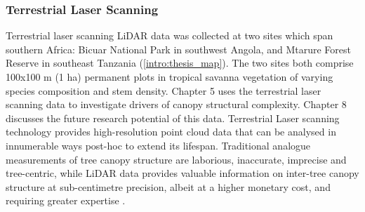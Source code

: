 \begin{refsection}
\subsubsection{Terrestrial Laser Scanning}
\label{intro:sssec:tls}

Terrestrial laser scanning LiDAR data was collected at two sites which span southern Africa: Bicuar National Park in southwest Angola, and Mtarure Forest Reserve in southeast Tanzania (\autoref{intro:thesis_map}). The two sites both comprise 100x100 m (1 ha) permanent plots in tropical savanna vegetation of varying species composition and stem density. Chapter 5 uses the terrestrial laser scanning data to investigate drivers of canopy structural complexity. Chapter 8 discusses the future research potential of this data. Terrestrial Laser scanning technology provides high-resolution point cloud data that can be analysed in innumerable ways post-hoc to extend its lifespan. Traditional analogue measurements of tree canopy structure are laborious, inaccurate, imprecise and tree-centric, while LiDAR data provides valuable information on inter-tree canopy structure at sub-centimetre precision, albeit at a higher monetary cost, and requiring greater expertise \citep{Xiao2019, Dassot2011}.

\newpage{}
\begingroup
{}
\printbibliography[heading=subbibintoc]
\endgroup

\end{refsection}


